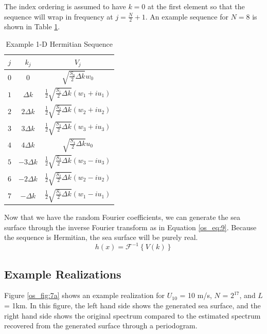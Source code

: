 The index ordering is assumed to have $k=0$ at the first element so that the sequence will wrap in frequency at $j = \frac{N}{2} + 1$. An example sequence for $N = 8$ is shown in Table \ref{os_tab:2a}.
\begin{table}[H]
  \begin{center}
      \renewcommand{\baselinestretch}{1} \small\normalsize
  \begin{quote}
    \caption[Example 1-D Hermitian Sequence]{Example 1-D Hermitian Sequence\label{os_tab:2a}}
  \end{quote}
  \begin{tabular} {| c | c | c |}
    \hline
  \bf{$j$} & \bf{$k_j$} & \bf{$V_j$} \\ \hline
  $0$ & $0$ & $\sqrt{\frac{S_{0}}{2} \Delta k}w_0$ \\ \hline
  $1$ & $\Delta k$ & $\frac{1}{2}\sqrt{\frac{S_{1}}{2} \Delta k} \left(w_1 + iu_1 \right)$ \\ \hline
  $2$ & $2\Delta k$ & $\frac{1}{2}\sqrt{\frac{S_{2}}{2} \Delta k} \left(w_2 + iu_2 \right)$ \\ \hline
  $3$ & $3\Delta k$ & $\frac{1}{2}\sqrt{\frac{S_{3}}{2} \Delta k} \left(w_3 + iu_3 \right)$ \\ \hline
  $4$ & $4\Delta k$ & $\sqrt{\frac{S_{4}}{2} \Delta k} u_0$ \\ \hline
  $5$ & $-3\Delta k$ & $\frac{1}{2}\sqrt{\frac{S_{3}}{2} \Delta k} \left(w_3 - iu_3 \right)$ \\ \hline
  $6$ & $-2\Delta k$ & $\frac{1}{2}\sqrt{\frac{S_{2}}{2} \Delta k} \left(w_2 - iu_2 \right)$  \\ \hline
  $7$ & $-\Delta k$ & $\frac{1}{2}\sqrt{\frac{S_{1}}{2} \Delta k} \left(w_1 - iu_1 \right)$ \\ \hline

\end{tabular}
\end{center}
\end{table}
\renewcommand{\baselinestretch}{2} \small\normalsize

Now that we have the random Fourier coefficients, we can generate the sea surface through the inverse Fourier transform as in Equation \ref{os_eq:9}. Because the sequence is Hermitian, the sea surface will be purely real.
\begin{equation}
  \label{os_eq:9}
  h(x) = \mathcal{F}^{-1}\left\{V(k) \right\}
  \end{equation}

\subsection{Example Realizations}
Figure \ref{os_fig:7a} shows an example realization for $U_{10}$ = 10 m/s, $N$ = $2^{17}$, and $L$ = 1km. In this figure, the left hand side shows the generated sea surface, and the right hand side shows the original spectrum compared to the estimated spectrum recovered from the generated surface through a periodogram.

